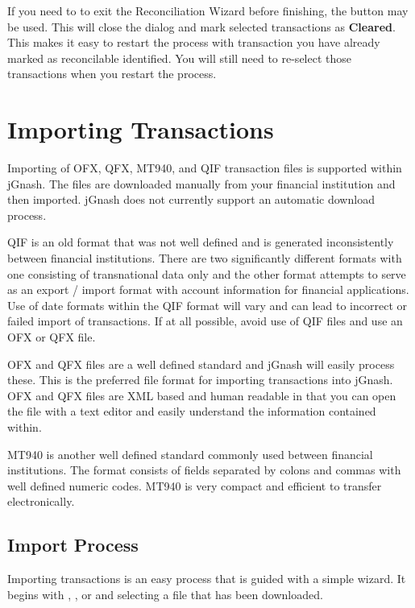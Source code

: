 \documentclass[letterpaper,12pt]{book}
\begin{document}
    If you need to to exit the Reconciliation Wizard before finishing, the  button may be used.
    This will close the dialog and mark selected transactions as \textbf{Cleared}.
    This makes it easy to restart the process with transaction you have already marked as reconcilable identified.
    You will still need to re-select those transactions when you restart the process.

    \chapter{Importing Transactions}

    Importing of OFX, QFX, MT940, and QIF transaction files is supported within jGnash.
    The files are downloaded manually from your financial institution and then imported.
    jGnash does not currently support an automatic download process.

    QIF is an old format that was not well defined and is generated inconsistently between financial institutions.
    There are two significantly different formats with one consisting of transnational data only and the other format
    attempts to serve as an export / import format with account information for financial applications.
    Use of date formats within the QIF format will vary and can lead to incorrect or failed import of transactions.
    If at all possible, avoid use of QIF files and use an OFX or QFX file.

    OFX and QFX files are a well defined standard and jGnash will easily process these.
    This is the preferred file format for importing transactions into jGnash.
    OFX and QFX files are XML based and human readable in that you can open the file
    with a text editor and easily understand the information contained within.

    MT940 is another well defined standard commonly used between financial institutions.
    The format consists of fields separated by colons and commas with well defined numeric codes.
    MT940 is very compact and efficient to transfer electronically.


    \section{Import Process}
    Importing transactions is an easy process that is guided with a simple wizard.
    It begins with , , or
     and selecting a file that has been downloaded.
\end{document}
